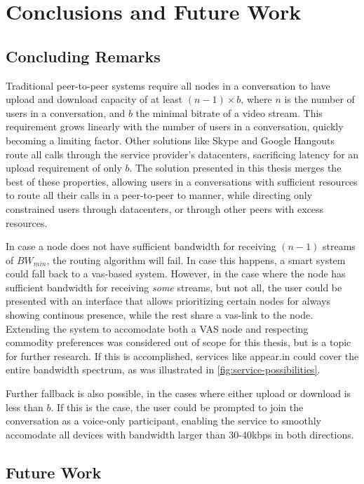 \chapter{Conclusions and Future Work}\label{chp:conclusions}


\section{Concluding Remarks}\label{sec:conclusions}

Traditional peer-to-peer systems require all nodes in a conversation to have upload and download capacity of at least $(n-1) \times b$, where $n$ is the number of users in a conversation, and $b$ the minimal bitrate of a video stream. This requirement grows linearly with the number of users in a conversation, quickly becoming a limiting factor. Other solutions like Skype and Google Hangouts route all calls through the service provider's datacenters, sacrificing latency for an upload requirement of only $b$. The solution presented in this thesis merges the best of these properties, allowing users in a conversations with sufficient resources to route all their calls in a peer-to-peer to manner, while directing only constrained users through datacenters, or through other peers with excess resources.

In case a node does not have sufficient bandwidth for receiving $(n-1)$ streams of $BW_{min}$, the routing algorithm will fail. In case this happens, a smart system could fall back to a \gls{vas}-based system. However, in the case where the node has sufficient bandwidth for receiving \emph{some} streams, but not all, the user could be presented with an interface that allows prioritizing certain nodes for always showing continous presence, while the rest share a \gls{vas}-link to the node. Extending the system to accomodate both a VAS node and respecting commodity preferences was considered out of scope for this thesis, but is a topic for further research. If this is accomplished, services like appear.in could cover the entire bandwidth spectrum, as was illustrated in \autoref{fig:service-possibilities}.

Further fallback is also possible, in the cases where either upload or download is less than $b$. If this is the case, the user could be prompted to join the conversation as a voice-only participant, enabling the service to smoothly accomodate all devices with bandwidth larger than 30-40kbps in both directions.


\section{Future Work}\label{sec:future_work}

